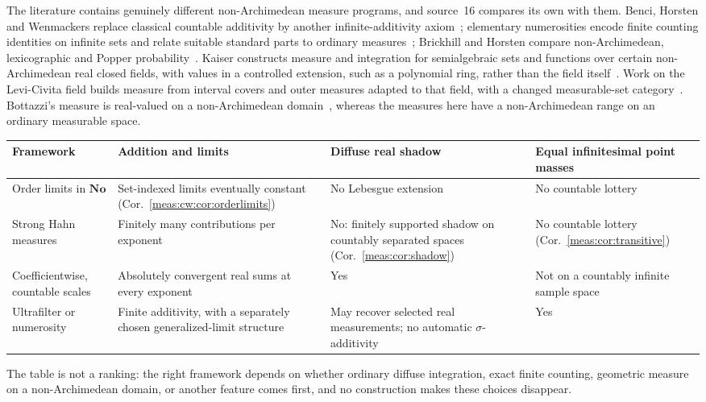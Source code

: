 \documentclass[11pt]{article}
\numberwithin{equation}{section}
\theoremstyle{definition}
\theoremstyle{remark}
\newcommand{\No}{\mathbf{No}}
\begin{document}
The literature contains genuinely different non-Archimedean measure programs,
and source~16 compares its own with them. Benci, Horsten and Wenmackers replace
classical countable additivity by another infinite-additivity axiom~\cite{BHW};
elementary numerosities encode finite counting identities on infinite sets and
relate suitable standard parts to ordinary measures~\cite{BBDN}; Brickhill and
Horsten compare non-Archimedean, lexicographic and Popper probability~\cite{BH}.
Kaiser constructs measure and integration for semialgebraic sets and functions
over certain non-Archimedean real closed fields, with values in a controlled
extension, such as a polynomial ring, rather than the field itself~\cite{Kaiser}.
Work on the Levi-Civita field builds measure from interval covers and outer
measures adapted to that field, with a changed measurable-set
category~\cite{LeviCivita}. Bottazzi's measure is real-valued on a
non-Archimedean domain~\cite{Bottazzi}, whereas the measures here have a
non-Archimedean range on an ordinary measurable space.

\begin{center}\small
\begin{tabularx}{\textwidth}{@{}>{\raggedright\arraybackslash}p{}
 >{\raggedright\arraybackslash}X>{\raggedright\arraybackslash}X
 >{\raggedright\arraybackslash}X@{}}
\toprule
Framework & Addition and limits & Diffuse real shadow & Equal infinitesimal
point masses\\
\midrule
Order limits in $\No$ & Set-indexed limits eventually constant
(Cor.~\ref{meas:cw:cor:orderlimits}) & No Lebesgue extension & No countable
lottery\\
Strong Hahn measures & Finitely many contributions per exponent & No: finitely
supported shadow on countably separated spaces (Cor.~\ref{meas:cor:shadow}) & No
countable lottery (Cor.~\ref{meas:cor:transitive})\\
Coefficientwise, countable scales & Absolutely convergent real sums at every
exponent & Yes & Not on a countably infinite sample space\\
Ultrafilter or numerosity & Finite additivity, with a separately chosen
generalized-limit structure & May recover selected real measurements; no
automatic $\sigma$-additivity & Yes\\
\bottomrule
\end{tabularx}
\end{center}

The table is not a ranking: the right framework depends on whether ordinary
diffuse integration, exact finite counting, geometric measure on a
non-Archimedean domain, or another feature comes first, and no construction makes
these choices disappear.
\end{document}
